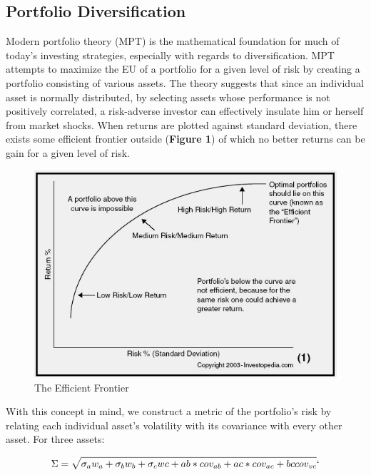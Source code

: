 \documentclass[12pt]{article}
\begin{document}
\subsection{Portfolio Diversification}
Modern portfolio theory (MPT) is the mathematical foundation for much of today's investing strategies, especially with regards to diversification. MPT attempts to maximize the EU of a portfolio for a given level of risk by creating a portfolio consisting of various assets. The theory suggests that since an individual asset is normally distributed, by selecting assets whose performance is not positively correlated, a risk-adverse investor can effectively insulate him or herself from market shocks. When returns are plotted against standard deviation, there exists some efficient frontier outside ({\bf Figure 1}) of which no better returns can be gain for a given level of risk.  

\begin{figure}[H]
	\begin{center}
		\includegraphics[scale=.75]{Figures/Efficient_Frontier.png}
		\caption{The Efficient Frontier}
	\end{center}
\end{figure}

With this concept in mind, we construct a metric of the portfolio's risk by relating each individual asset's volatility with its covariance with every other asset. For three assets:

\begin{equation}
	\Sigma = \sqrt{\sigma_{a} w_{a} + \sigma_{b} w_{b} + \sigma_{c} w{c} + ab*cov_{ab} + ac * cov_{ac} + bc cov_{vc} }`
\end{equation}
\end{document}
